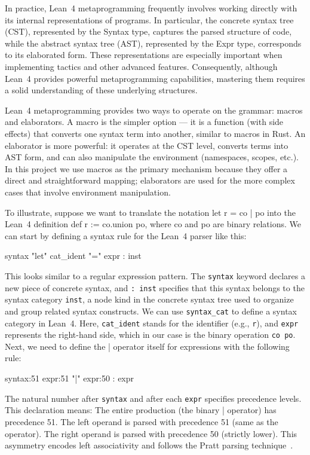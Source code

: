 In practice, Lean~4 metaprogramming frequently involves working directly with its internal representations of programs. In particular, the concrete syntax tree (CST), represented by the Syntax type, captures the parsed structure of code, while the abstract syntax tree (AST), represented by the Expr type, corresponds to its elaborated form. These representations are especially important when implementing tactics and other advanced features. Consequently, although Lean~4 provides powerful metaprogramming capabilities, mastering them requires a solid understanding of these underlying structures.

Lean~4 metaprogramming provides two ways to operate on the grammar: macros and elaborators. A macro is the simpler option — it is a function (with side effects) that converts one syntax term into another, similar to macros in Rust. An elaborator is more powerful: it operates at the CST level, converts terms into AST form, and can also manipulate the environment (namespaces, scopes, etc.). In this project we use macros as the primary mechanism because they offer a direct and straightforward mapping; elaborators are used for the more complex cases that involve environment manipulation.

To illustrate, suppose we want to translate the notation let r = co | po into the Lean~4 definition def r := co.union po, where co and po are binary relations. We can start by defining a syntax rule for the Lean~4 parser like this: 

syntax "let" cat\_ident "=" expr : inst


This looks similar to a regular expression pattern. The \verb|syntax| keyword declares a new piece of concrete syntax, and \verb|: inst| specifies that this syntax belongs to the syntax category \verb|inst|, a node kind in the concrete syntax tree used to organize and group related syntax constructs. We can use \texttt{syntax\_cat} to define a syntax category in Lean~4. Here, \verb|cat_ident| stands for the identifier (e.g., \verb|r|), and \verb|expr| represents the right-hand side, which in our case is the binary operation \texttt{co \textbar{} po}. Next, we need to define the \verb||| operator itself for expressions with the following rule:

syntax:51 expr:51 "|" expr:50 : expr

The natural number after \verb|syntax| and after each \verb|expr| specifies precedence levels. This declaration means: The entire production (the binary | operator) has precedence 51.
The left operand is parsed with precedence 51 (same as the operator).
The right operand is parsed with precedence 50 (strictly lower).
This asymmetry encodes left associativity and follows the Pratt parsing technique~\citep{pratt1973top}.

